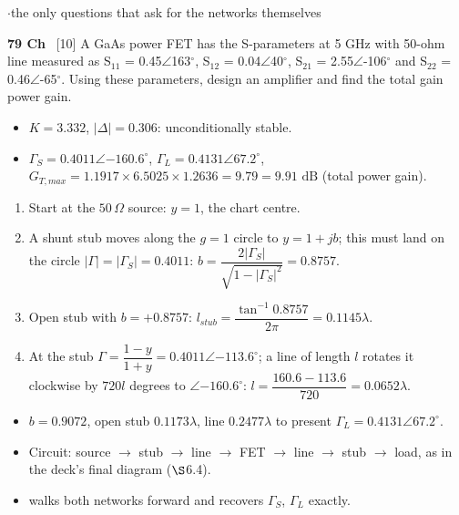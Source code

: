\vspace{2pt}

{\color{sub}\footnotesize {} \gap$\cdot$\gap the only questions that ask for the networks themselves}

\begin{asked}{\textbf{79 Ch} \ [10]}
A GaAs power FET has the S-parameters at 5 GHz with 50-ohm line measured as S$_{11}$ = 0.45$\angle$163$^\circ$, S$_{12}$ = 0.04$\angle$40$^\circ$, S$_{21}$ = 2.55$\angle$-106$^\circ$ and S$_{22}$ = 0.46$\angle$-65$^\circ$. Using these parameters, design an amplifier and find the total gain power gain.
\end{asked}
\begin{itemize}
  \item $K = 3.332$, $|\Delta| = 0.306$: unconditionally stable.
  \item $\Gamma_S = 0.4011\angle{-160.6^\circ}$, $\Gamma_L = 0.4131\angle67.2^\circ$,
    $G_{T,max} = 1.1917\times6.5025\times1.2636 = \boxed{9.79 = 9.91\text{ dB}}$ (total power gain).
\end{itemize}
\begin{enumerate}[label=\arabic*., leftmargin=1.4em, itemsep=1pt]
  \item Start at the $50\,\Omega$ source: $y = 1$, the chart centre.
  \item A shunt stub moves along the $g = 1$ circle to $y = 1 + jb$; this must land on the
    circle $|\Gamma| = |\Gamma_S| = 0.4011$: $b = \dfrac{2|\Gamma_S|}{\sqrt{1 - |\Gamma_S|^2}} = 0.8757$.
  \item Open stub with $b = +0.8757$: $l_{stub} = \dfrac{\tan^{-1}0.8757}{2\pi} = \boxed{0.1145\lambda}$.
  \item At the stub $\Gamma = \dfrac{1 - y}{1 + y} = 0.4011\angle{-113.6^\circ}$; a line of length $l$
    rotates it clockwise by $720l$ degrees to $\angle{-160.6^\circ}$:
    $l = \dfrac{160.6 - 113.6}{720} = \boxed{0.0652\lambda}$.
\end{enumerate}
\begin{itemize}
  \item $b = 0.9072$, open stub $\boxed{0.1173\lambda}$, line $\boxed{0.2477\lambda}$ to present
    $\Gamma_L = 0.4131\angle67.2^\circ$.
  \item Circuit: source $\rightarrow$ stub $\rightarrow$ line $\rightarrow$ FET $\rightarrow$
    line $\rightarrow$ stub $\rightarrow$ load, as in the deck's final diagram ($\S$6.4).
  \item {} walks both networks forward and recovers $\Gamma_S$, $\Gamma_L$ exactly.
\end{itemize}
